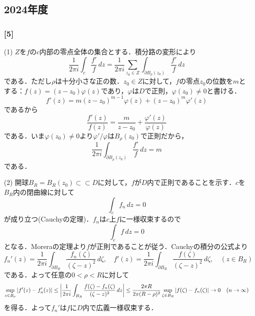 \documentclass[a4j]{ltjsarticle}
\newcommand{\1}{\mathbbm{1}}
\numberwithin{equation}{section}
\theoremstyle{definition}
\begin{document}
\subsection{2024年度}
\subsubsection*{[5]}\label{2024_pm_5}
(1) $Z$を$f$の$c$内部の零点全体の集合とする．積分路の変形により
\begin{equation}
    \frac{1}{2\pi i}\int_{c}\frac{f'}{f}\,dz=\frac{1}{2\pi i}\sum_{z_0\in Z}\int_{\partial B_{\rho}(z_0)}\frac{f'}{f}\,dz 
\end{equation}
である．ただし$\rho$は十分小さな正の数．$z_0\in Z$に対して，$f$の零点$z_0$の位数を$m$とする：$f(z)=(z-z_0)\varphi(z)$であり，$\varphi$は$D$で正則，$\varphi(z_0)\neq0$と書ける．
\begin{equation}
    f'(z)=m(z-z_0)^{m-1}\varphi(z)+(z-z_0)^m\varphi'(z)
\end{equation}
であるから
\begin{equation}
    \frac{f'(z)}{f(z)}=\frac{m}{z-z_0}+\frac{\varphi'(z)}{\varphi(z)}
\end{equation}
である．いま$\varphi(z_0)\neq0$より$\varphi'/\varphi$は$B_{\rho}(z_0)$で正則だから，
\begin{equation}
    \frac{1}{2\pi i}\int_{\partial B_{\rho}(z_0)}\frac{f'}{f}\,dz=m 
\end{equation}
である．

(2) 開球$B_R=B_{R}(z_0)\subset\subset D$に対して，$f$が$D$内で正則であることを示す．$c$を$B_R$内の閉曲線に対して
\begin{equation}
    \int_{c}f_n\,dz=0 
\end{equation}
が成り立つ(Cauchyの定理)．$f_n$は$c$上$f$に一様収束するので
\begin{equation}
    \int_{c}f\,dz=0 
\end{equation}
となる．Moreraの定理より$f$が正則であることが従う．Cauchyの積分の公式より
\begin{equation}
    f_n'(z)=\frac{1}{2\pi i}\int_{\partial B_R}\frac{f_n(\zeta)}{(\zeta-z)^2}\,d\zeta,\quad f'(z)=\frac{1}{2\pi i}\int_{\partial B_R}\frac{f(\zeta)}{(\zeta-z)^2}\,d\zeta,\quad (z\in B_R)
\end{equation}
である．よって任意の$0<\rho<R$に対して
\begin{equation}
    \sup_{z\in B_\rho}\abs{f'(z)-f_n'(z)}\leq \abs{\frac{1}{2\pi i}\int_{B_R}\frac{f(\zeta)-f_n(\zeta)}{(\zeta-z)^2}\,dz}\leq \frac{2\pi R}{2\pi(R-\rho)^2}\sup_{\zeta\in B_R}\abs{f(\zeta)-f_n(\zeta)}\to 0 \quad (n\to\infty)
\end{equation}
を得る．よって$f_n'$は$f$に$D$内で広義一様収束する．
\end{document}
